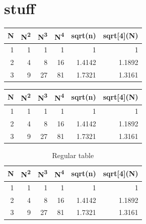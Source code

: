 \documentclass[12pt]{extarticle}
\begin{document}
\section{stuff}
\label{sec:orgbd765b7}
\begin{minipage}{.5\textwidth}
\begin{center}
\begin{tabular}{|r|rrr|rr|}
\hline
N & N\textsuperscript{2} & N\textsuperscript{3} & N\textsuperscript{4} & sqrt(n) & sqrt[4](N)\\
\hline
1 & 1 & 1 & 1 & 1 & 1\\
2 & 4 & 8 & 16 & 1.4142 & 1.1892\\
3 & 9 & 27 & 81 & 1.7321 & 1.3161\\
\hline
\end{tabular}
\end{center}
\vspace*{-5mm}
\label{tbl:table1}
\end{minipage}
\begin{minipage}{.5\textwidth}
\begin{center}
\begin{tabular}{|r|rrr|rr|}
\hline
N & N\textsuperscript{2} & N\textsuperscript{3} & N\textsuperscript{4} & sqrt(n) & sqrt[4](N)\\
\hline
1 & 1 & 1 & 1 & 1 & 1\\
2 & 4 & 8 & 16 & 1.4142 & 1.1892\\
3 & 9 & 27 & 81 & 1.7321 & 1.3161\\
\hline
\end{tabular}
\end{center}
\vspace*{-5mm}
\label{tbl:table2}
\end{minipage}

\begin{table}[htbp]
\caption{\label{tbl:table3}Regular table}
\centering
\begin{tabular}{|r|rrr|rr|}
\hline
N & N\textsuperscript{2} & N\textsuperscript{3} & N\textsuperscript{4} & sqrt(n) & sqrt[4](N)\\
\hline
1 & 1 & 1 & 1 & 1 & 1\\
2 & 4 & 8 & 16 & 1.4142 & 1.1892\\
3 & 9 & 27 & 81 & 1.7321 & 1.3161\\
\hline
\end{tabular}
\end{table}
\end{document}
